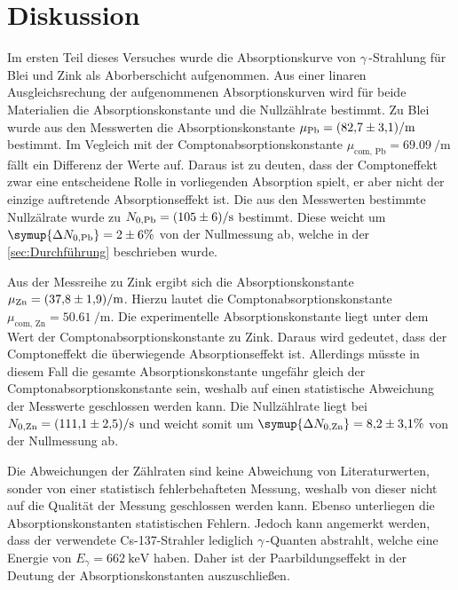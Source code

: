 \section{Diskussion}
\label{sec:Diskussion}
Im ersten Teil dieses Versuches wurde die Absorptionskurve von $\gamma$\,-Strahlung für Blei und Zink als Aborberschicht aufgenommen. Aus einer linaren Ausgleichsrechung der
aufgenommenen Absorptionskurven wird für beide Materialien die Absorptionskonstante und die Nullzählrate bestimmt. Zu Blei wurde aus den Messwerten die Absorptionskonstante 
$\mu_\text{Pb} = \qty{82.7 +- 3.1}{\per\metre}$ bestimmt. Im Vegleich mit der Comptonabsorptionskonstante $\mu_\text{com, Pb} = \qty{69.09}{\per\metre}$ fällt ein Differenz der Werte auf.
Daraus ist zu deuten, dass der Comptoneffekt zwar eine entscheidene Rolle in vorliegenden Absorption spielt, er aber nicht der einzige auftretende Absorptionseffekt ist.
Die aus den Messwerten bestimmte Nullzälrate wurde zu $N_{0, \text{Pb}} = \qty{105 +- 6}{\per\second}$ bestimmt. Diese weicht um $\symup{\Delta N_{0, \text{Pb}}} = \num{2 +- 6}\%$
von der Nullmessung ab, welche in der \autoref{sec:Durchführung} beschrieben wurde.

Aus der Messreihe zu Zink ergibt sich die Absorptionskonstante $\mu_{\text{Zn}} = \qty{37.8 +- 1.9}{\per\metre}$. Hierzu lautet die Comptonabsorptionskonstante 
$\mu_{\text{com, Zn}} = \qty{50.61}{\per\metre}$. Die experimentelle Absorptionskonstante liegt unter dem Wert der Comptonabsorptionskonstante zu Zink. Daraus wird gedeutet, 
dass der Comptoneffekt die überwiegende Absorptionseffekt ist. Allerdings müsste in diesem Fall die gesamte Absorptionskonstante ungefähr gleich der Comptonabsorptionskonstante 
sein, weshalb auf einen statistische Abweichung der Messwerte geschlossen werden kann. 
Die Nullzählrate liegt bei $N_{0, \text{Zn}} = \qty{111.1 +- 2.5}{\per\second}$ und weicht somit um $\symup{\Delta N_{0, \text{Zn}}} = \num{8.2 +- 3.1}\%$ von der Nullmessung ab.

Die Abweichungen der Zählraten sind keine Abweichung von Literaturwerten, sonder von einer statistisch fehlerbehafteten Messung, weshalb von dieser nicht auf die Qualität der
Messung geschlossen werden kann. Ebenso unterliegen die Absorptionskonstanten statistischen Fehlern. 
Jedoch kann angemerkt werden, dass der verwendete Cs-137-Strahler lediglich $\gamma$\,-Quanten abstrahlt, welche eine Energie von $E_\gamma = \qty{662}{\kilo\electronvolt}$
\cite{physikalischesGrundpraktikum} haben. Daher ist der Paarbildungseffekt in der Deutung der Absorptionskonstanten auszuschließen.

